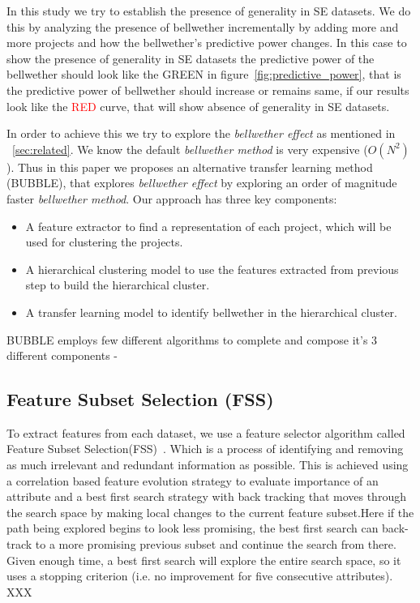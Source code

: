 \documentclass[sigconf]{acmart}
\newcommand{\bi}{\begin{itemize}[leftmargin=0.4cm]}
\newcommand{\ei}{\end{itemize}}
\theoremstyle{break}
\begin{document}
In this study we try to establish the presence of generality in SE datasets. We do this by analyzing the presence of bellwether incrementally by adding more and more projects and how the bellwether's predictive power changes. In this case to show the presence of generality in SE datasets the predictive power of the bellwether should look like the \textcolor{ao(english)}{GREEN} in figure~\ref{fig:predictive_power}, that is the predictive power of bellwether should increase or remains same, if our results look like the \textcolor{red}{RED} curve, that will show absence of generality in SE datasets.

In order to achieve this we try to explore the \textit{bellwether effect} as mentioned in ~\ref{sec:related}. We know the default \textit{bellwether method} is very expensive ($ O(N^2) $). Thus in this paper we proposes an alternative transfer learning method (BUBBLE), that explores \textit{bellwether effect} by exploring an order of magnitude faster \textit{bellwether method}. Our approach has three key components:

\bi

    \item A feature extractor to find a representation of each project, which will be used for clustering the projects. 
    
    \item A hierarchical clustering model to use the features extracted from previous step to build the hierarchical cluster.
    
    \item A transfer learning model to identify bellwether in the hierarchical cluster.

\ei

BUBBLE employs few different algorithms to complete and compose it's 3 different components - 

\subsection{Feature Subset Selection (FSS)}
\label{subsec:FSS}
To extract features from each dataset, we use a feature selector algorithm called Feature Subset Selection(FSS)~\cite{hall1999correlation,hall1997feature}. Which is a process of identifying and removing as much irrelevant and redundant information as possible. This is achieved using a correlation based feature evolution strategy to evaluate importance of an attribute and a best first search strategy with back tracking that moves through the search space by making local changes to the current feature subset.Here if the path being explored begins to look less promising, the best first search can back-track to a more promising previous subset and continue the search from there. Given enough time, a best first search will explore the entire search space, so it uses a stopping criterion (i.e. no improvement for five consecutive attributes). XXX
\end{document}
